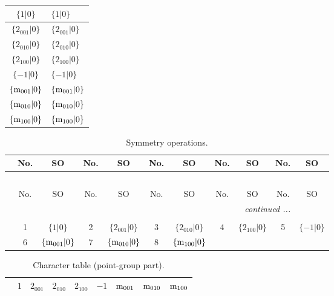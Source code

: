 \documentclass[fleqn,10pt,landscape]{article}
\begin{document}
\begin{itemize}
\begin{center}
\begin{longtable}{c|l}
$\{1|0\}$ & $\{1|0\}$ \\ \hline
$\{2{}_{001}|0\}$ & $\{2{}_{001}|0\}$ \\ \hline
$\{2{}_{010}|0\}$ & $\{2{}_{010}|0\}$ \\ \hline
$\{2{}_{100}|0\}$ & $\{2{}_{100}|0\}$ \\ \hline
$\{-1|0\}$ & $\{-1|0\}$ \\ \hline
$\{{\rm m}_{001}|0\}$ & $\{{\rm m}_{001}|0\}$ \\ \hline
$\{{\rm m}_{010}|0\}$ & $\{{\rm m}_{010}|0\}$ \\ \hline
$\{{\rm m}_{100}|0\}$ & $\{{\rm m}_{100}|0\}$ \\
\end{longtable}
\end{center}
\begin{center}
\renewcommand{\arraystretch}{1.3}
\begin{longtable}{c|cc|cc|cc|cc|cc}
\caption{Symmetry operations.}
 \\
 \hline \hline
 & No. & SO & No. & SO & No. & SO & No. & SO & No. & SO \\ \hline \endfirsthead

\multicolumn{10}{l}{\tablename\ \thetable{}} \\
 \hline \hline
 & No. & SO & No. & SO & No. & SO & No. & SO & No. & SO \\ \hline \endhead

 \hline \hline
\multicolumn{10}{r}{\footnotesize\it continued ...} \\ \endfoot

 \hline \hline
\multicolumn{10}{r}{} \\ \endlastfoot

 & 1 & $\{1|0\}$ & 2 & $\{2{}_{001}|0\}$ & 3 & $\{2{}_{010}|0\}$ & 4 & $\{2{}_{100}|0\}$ & 5 & $\{-1|0\}$ \\
& 6 & $\{{\rm m}_{001}|0\}$ & 7 & $\{{\rm m}_{010}|0\}$ & 8 & $\{{\rm m}_{100}|0\}$ &  &  &  &  \\
\end{longtable}
\end{center}
\begin{center}
\renewcommand{\arraystretch}{1.0}
\begin{longtable}{c|rrrrrrrr}
\caption{Character table (point-group part).}
 \\
 \hline \hline
 & $ 1 $ & $ 2{}_{001} $ & $ 2{}_{010} $ & $ 2{}_{100} $ & $ -1 $ & $ {\rm m}_{001} $ & $ {\rm m}_{010} $ & $ {\rm m}_{100} $ \\ \hline \endfirsthead


\end{longtable}
\end{center}
\end{itemize}
\end{document}
